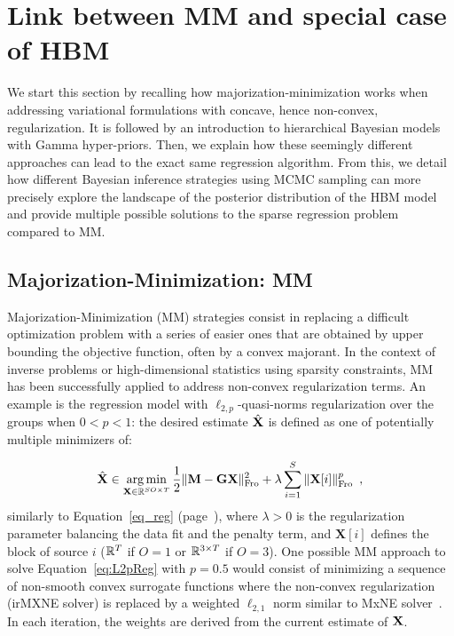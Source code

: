 \section{Link between MM and special case of HBM}\label{link_hbm_mm}

We start this section by recalling how majorization-minimization works
when addressing variational formulations with concave, hence non-convex, regularization. It is followed by an introduction to hierarchical Bayesian models with Gamma hyper-priors. Then, we explain how these seemingly different approaches can lead to the exact same regression algorithm.
From this, we detail how different Bayesian inference strategies using MCMC
sampling can more precisely explore the landscape of the posterior distribution of the HBM model and provide multiple possible solutions to the sparse regression problem compared to MM.

\subsection{Majorization-Minimization: MM}
\label{section:MM}

Majorization-Minimization (MM) strategies consist in replacing a difficult optimization problem with a series of easier ones that are obtained by upper bounding the objective function, often by a convex majorant.
%
In the context of inverse problems or high-dimensional statistics using sparsity constraints, MM has been successfully applied to address non-convex regularization terms. An example is the regression model with $\ell_{2,p}$-quasi-norms regularization over the groups when $0<p<1$: the desired estimate $\hat{\mathbf{X}}$ is defined as one of potentially multiple minimizers of:

\begin{equation} \label{eq:L2pReg}
\hat{\mathbf{X}} \in \mathop{\mathrm{arg}\,\mathrm{min}}_{\mathbf{X}\in\mathbb{R}^{SO \times T}} \frac{1}{2} \|{\mathbf{M} - \mathbf{G} \mathbf{X}}\|_{\rm Fro}^2  + \lambda \sum_{i=1}^S \|{\mathbf{X}{[i]}}\|_{\rm Fro}^p \enspace,
\end{equation}
similarly to Equation~\eqref{eq_reg} (page~\pageref{eq_reg}), where $\lambda > 0$ is the regularization parameter balancing the data fit and the penalty term, and $\mathbf{X}[i]$ defines the block of source $i$ ($\mathbb{R}^T$ if $O=1$ or $\mathbb{R}^{3\times T}$ if $O=3$). One possible MM approach to solve Equation~\eqref{eq:L2pReg} with $p=0.5$ would consist of minimizing a sequence of non-smooth convex surrogate functions where the non-convex regularization (irMXNE solver) is replaced by a weighted $\ell_{2,1}$ norm similar to MxNE solver~\cite{strohmeier-etal:16}. In each iteration, the weights are derived from the current estimate of $\mathbf{X}$.

